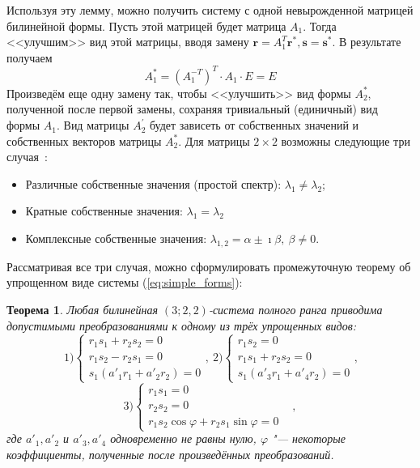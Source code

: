 \documentclass[10pt]{article}
\newtheorem{theorem}{Теорема}
\begin{document}
Используя эту лемму, можно получить систему с одной невырожденной матрицей 
билинейной формы. Пусть этой матрицей будет матрица $A_1$. Тогда <<улучшим>> вид этой матрицы, вводя замену
$
	\mathbf{r} =  A_1^T \mathbf{r}^*, \mathbf{s} = \mathbf{s}^*
$.
В результате получаем
$$ 
	A_1^* = (A_1^{-T})^T \cdot A_1 \cdot E = E
$$
Произведём еще одну замену так, чтобы <<улучшить>> вид формы $A_2^*$, полученной после 
первой замены, сохраняя тривиальный (единичный) вид формы $A_1$. Вид матрицы $A_2^{'}$ 
будет зависеть от собственных значений и собственных векторов матрицы $A_2^*$. Для матрицы 
$2 \times 2$ возможны следующие три случая~\cite{costrikin_va2}: 
\begin{itemize}
	\item Различные собственные значения (простой спектр): $\lambda_1 \ne \lambda_2$;
	\item Кратные собственные значения: $\lambda_1 = \lambda_2$
	\item Комплексные собственные значения: $\lambda_{1,2} = \alpha \pm \imath \beta,~\beta 
	\ne 0$.
\end{itemize}
Рассматривая все три случая, можно  сформулировать промежуточную теорему об упрощенном виде системы (\ref{eq:simple_forms}):
\begin{theorem}
Любая билинейная $(3;2,2)$-система полного ранга приводима допустимыми преобразованиями к 
одному из трёх упрощенных видов: 
	\begin{equation*}\
		1)\begin{cases}
			r_1 s_1 + r_2 s_2 = 0 \\ 
			r_1 s_2 - r_2 s_1 = 0 \\ 
			s_1 (a'_{1} r_1 + a'_{2} r_2) = 0
		\end{cases},
		~
		2)\begin{cases}
			r_1 s_2 = 0 \\
			r_1 s_1 + r_2 s_2 = 0 \\
			s_1 (a'_{3} r_1 + a'_{4} r_2) = 0
		\end{cases},
	\end{equation*}
	\begin{equation}\label{eq:simplified_equations}
		3)\begin{cases}
		 	r_1 s_1 = 0 \\
		 	r_2 s_2 = 0 \\
		 	r_1 s_2 \cos \varphi + r_2 s_1 \sin \varphi = 0 &
		\end{cases},
	\end{equation}
	где $a'_1, a'_2$ и $a'_3, a'_4$ одновременно не равны нулю, $\varphi$ "--- некоторые коэффициенты, 	полученные после произведённых преобразований.
\end{theorem}
\end{document}
